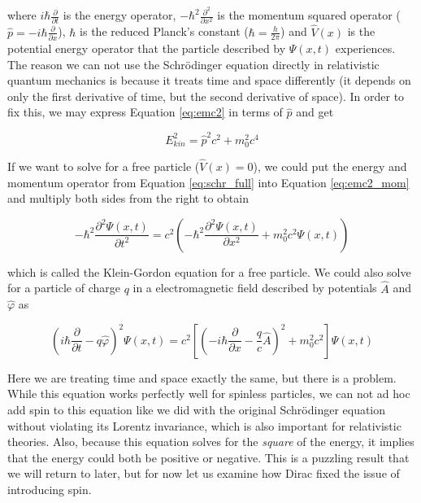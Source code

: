 where $i\hbar\frac{\partial}{\partial t}$ is the energy operator, $-\hbar^{2}\frac{\partial^{2}}{\partial x^{2}}$ is the momentum squared operator ($\hat{p} = -i\hbar\frac{\partial}{\partial x}$), $\hbar$ is the reduced Planck's constant ($\hbar = \frac{h}{2\pi}$) and $\hat{V}(x)$ is the potential energy operator that the particle described by $\Psi(x, t)$ experiences. The reason we can not use the Schr\"{o}dinger equation directly in relativistic quantum mechanics is because it treats time and space differently (it depends on only the first derivative of time, but the second derivative of space). In order to fix this, we may express Equation \ref{eq:emc2} in terms of $\hat{p}$ and get\cite{Piela}

\begin{equation}
\label{eq:emc2_mom}
E_{kin}^{2} = \hat{p}^{2}c^{2} + m_{0}^{2}c^{4}
\end{equation}

If we want to solve for a free particle ($\hat{V}(x) = 0$), we could put the energy and momentum operator from Equation \ref{eq:schr_full} into Equation \ref{eq:emc2_mom} and multiply both sides from the right to obtain

\begin{equation}
\label{eq:klein-gord_free}
-\hbar^{2}\frac{\partial^{2}\Psi(x,t)}{\partial t^{2}} = c^{2}\left(-\hbar^{2}\frac{\partial^{2}\Psi(x, t)}{\partial x^{2}} + m_{0}^{2}c^{2}\Psi(x,t)\right)
\end{equation}

which is called the Klein-Gordon\cite{Gordon1926, Klein1927} equation for a free particle. We could also solve for a particle of charge $q$ in a electromagnetic field described by potentials $\hat{A}$ and $\hat{\varphi}$ as

\begin{equation}
\label{eq:klein-gord_elec_mag}
\left(i\hbar\frac{\partial}{\partial t} -q\hat{\varphi}\right)^{2}\Psi(x, t) = c^{2}\left[\left(-i\hbar\frac{\partial}{\partial x} - \frac{q}{c}\hat{A}\right)^{2} + m_{0}^{2}c^{2}\right]\Psi(x,t)
\end{equation}

Here we are treating time and space exactly the same, but there is a problem. While this equation works perfectly well for spinless particles, we can not ad hoc add spin to this equation like we did with the original Schr\"{o}dinger equation without violating its Lorentz invariance, which is also important for relativistic theories. Also, because this equation solves for the \textit{square} of the energy, it implies that the energy could both be positive or negative. This is a puzzling result that we will return to later, but for now let us examine how Dirac fixed the issue of introducing spin. 

